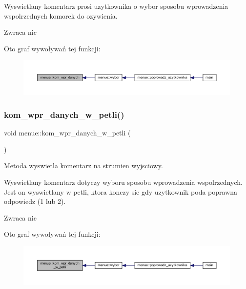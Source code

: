 Wyswietlany komentarz prosi uzytkownika o wybor sposobu wprowadzenia wspolrzednych komorek do ozywienia. \begin{DoxyReturn}{Zwraca}
nic 
\end{DoxyReturn}
Oto graf wywoływań tej funkcji\+:
\nopagebreak
\begin{figure}[H]
\begin{center}
\leavevmode
\includegraphics[width=350pt]{classmenue_a799c1d6893e274fc84d5fc83229e740a_icgraph}
\end{center}
\end{figure}
\mbox{\label{classmenue_a3902f4dcca17c168edf03ae828719e3d}} 
\subsubsection{\texorpdfstring{kom\+\_\+wpr\+\_\+danych\+\_\+w\+\_\+petli()}{kom\_wpr\_danych\_w\_petli()}}
{\footnotesize\ttfamily void menue\+::kom\+\_\+wpr\+\_\+danych\+\_\+w\+\_\+petli (\begin{DoxyParamCaption}{ }\end{DoxyParamCaption})\hspace{0.3cm}{\ttfamily [static]}}

Metoda wyswietla komentarz na strumien wyjsciowy.

Wyswietlany komentarz dotyczy wyboru sposobu wprowadzenia wspolrzednych. Jest on wyswietlany w petli, ktora konczy sie gdy uzytkownik poda poprawna odpowiedz (1 lub 2). \begin{DoxyReturn}{Zwraca}
nic 
\end{DoxyReturn}
Oto graf wywoływań tej funkcji\+:
\nopagebreak
\begin{figure}[H]
\begin{center}
\leavevmode
\includegraphics[width=350pt]{classmenue_a3902f4dcca17c168edf03ae828719e3d_icgraph}
\end{center}
\end{figure}
\mbox{\label{classmenue_a96748d0634771d7150c1eb73ed7472c5}} 
